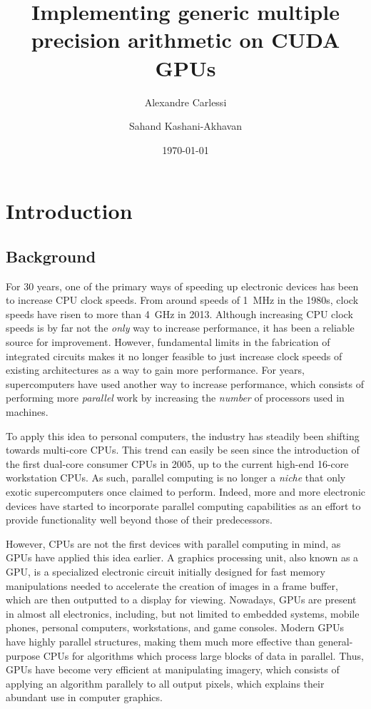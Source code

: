 \documentclass[12pt, a4paper]{report}
\newcommand{\mytitle}{\small Implementing generic multiple precision arithmetic on CUDA GPUs}
\begin{document}
\title{\mytitle}
\author{Alexandre Carlessi \and Sahand Kashani-Akhavan}
\date{\today}




\tableofcontents

\chapter{Introduction}
\section{Background}
For 30 years, one of the primary ways of speeding up electronic devices has been
to increase CPU clock speeds.
From around speeds of 1~MHz in the 1980s, clock speeds have risen to more than
4~GHz in 2013.
Although increasing CPU clock speeds is by far not the \emph{only} way to
increase performance, it has been a reliable source for improvement.
However, fundamental limits in the fabrication of integrated circuits makes it
no longer feasible to just increase clock speeds of existing architectures as a
way to gain more performance.
For years, supercomputers have used another way to increase performance, which
consists of performing more \emph{parallel} work by increasing the \emph{number}
of processors used in machines.

To apply this idea to personal computers, the industry has steadily been
shifting towards multi-core CPUs.
This trend can easily be seen since the introduction of the first dual-core
consumer CPUs in 2005, up to the current high-end 16-core workstation CPUs.
As such, parallel computing is no longer a \emph{niche} that only exotic
supercomputers once claimed to perform.
Indeed, more and more electronic devices have started to incorporate parallel
computing capabilities as an effort to provide functionality well beyond those
of their predecessors.

However, CPUs are not the first devices with parallel computing in mind, as GPUs
have applied this idea earlier.
A graphics processing unit, also known as a GPU, is a specialized electronic
circuit initially designed for fast memory manipulations needed to accelerate
the creation of images in a frame buffer, which are then outputted to a display
for viewing.
Nowadays, GPUs are present in almost all electronics, including, but not limited
to embedded systems, mobile phones, personal computers, workstations, and game
consoles.
Modern GPUs have highly parallel structures, making them much more effective
than general-purpose CPUs for algorithms which process large blocks of data in
parallel.
Thus, GPUs have become very efficient at manipulating imagery, which consists
of applying an algorithm parallely to all output pixels, which explains their
abundant use in computer graphics.
\end{document}
